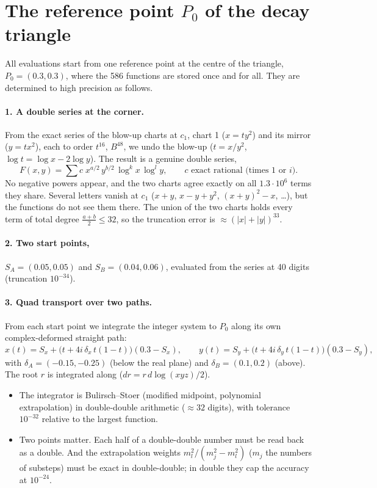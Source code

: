 \documentclass[11pt]{article}
\begin{document}
\section{The reference point $P_0$ of the decay triangle}
All evaluations start from one reference point at the centre of the triangle, $P_0=(0.3,0.3)$, where the 586 functions
are stored once and for all. They are determined to high precision as follows.

\paragraph{1. A double series at the corner.} From the exact series of the blow-up charts at $c_1$, chart 1 ($x=ty^2$)
and its mirror ($y=tx^2$), each to order $t^{16}$, $B^{48}$, we undo the blow-up ($t=x/y^2$,
$\log t=\log x-2\log y$). The result is a genuine double series,
\[
  F(x,y)=\sum c\;x^{a/2}\,y^{b/2}\,\log^kx\,\log^ly,\qquad c\text{ exact rational (times 1 or }i).
\]
No negative powers appear, and the two charts agree exactly on all $1.3\cdot10^6$ terms they share. Several letters
vanish at $c_1$ ($x+y$, $x-y+y^2$, $(x+y)^2-x$, \dots), but the functions do not see them there. The union of the two
charts holds every term of total degree $\frac{a+b}2\le32$, so the truncation error is $\approx(|x|+|y|)^{33}$.

\paragraph{2. Two start points,} $S_A=(0.05,0.05)$ and $S_B=(0.04,0.06)$, evaluated from the series at 40 digits
(truncation $10^{-34}$).

\paragraph{3. Quad transport over two paths.} From each start point we integrate the integer system to $P_0$ along its
own complex-deformed straight path:
\[
  x(t)=S_x+\big(t+4i\,\delta_x\,t(1-t)\big)(0.3-S_x),\qquad y(t)=S_y+\big(t+4i\,\delta_y\,t(1-t)\big)(0.3-S_y),
\]
with $\delta_A=(-0.15,-0.25)$ (below the real plane) and $\delta_B=(0.1,0.2)$ (above). The root $r$ is integrated
along ($dr=r\,d\log(xyz)/2$).
\begin{itemize}
\item The integrator is Bulirsch--Stoer (modified midpoint, polynomial extrapolation) in double-double arithmetic
  ($\approx32$ digits), with tolerance $10^{-32}$ relative to the largest function.
\item Two points matter. Each half of a double-double number must be read back as a double. And the extrapolation
  weights $m_l^2/(m_j^2-m_l^2)$ ($m_j$ the numbers of substeps) must be exact in double-double; in double they cap the accuracy at $10^{-24}$.
\end{itemize}
\end{document}
